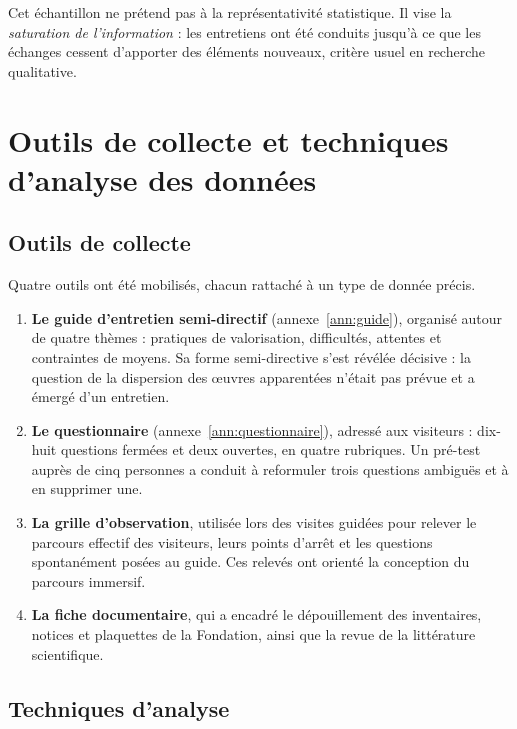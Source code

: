 Cet échantillon ne prétend pas à la représentativité statistique. Il vise la
\emph{saturation de l'information} : les entretiens ont été conduits jusqu'à ce
que les échanges cessent d'apporter des éléments nouveaux, critère usuel en
recherche qualitative.

\section{Outils de collecte et techniques d'analyse des données}
\label{sec:outils}

\subsection{Outils de collecte}

Quatre outils ont été mobilisés, chacun rattaché à un type de donnée précis.

\begin{enumerate}
  \item \textbf{Le guide d'entretien semi-directif} (annexe~\ref{ann:guide}),
        organisé autour de quatre thèmes : pratiques de valorisation,
        difficultés, attentes et contraintes de moyens. Sa forme semi-directive
        s'est révélée décisive : la question de la dispersion des œuvres
        apparentées n'était pas prévue et a émergé d'un entretien.

  \item \textbf{Le questionnaire} (annexe~\ref{ann:questionnaire}), adressé aux
        visiteurs : dix-huit questions fermées et deux ouvertes, en quatre
        rubriques. Un pré-test auprès de cinq personnes a conduit à reformuler
        trois questions ambiguës et à en supprimer une.

  \item \textbf{La grille d'observation}, utilisée lors des visites guidées pour
        relever le parcours effectif des visiteurs, leurs points d'arrêt et les
        questions spontanément posées au guide. Ces relevés ont orienté la
        conception du parcours immersif.

  \item \textbf{La fiche documentaire}, qui a encadré le dépouillement des
        inventaires, notices et plaquettes de la Fondation, ainsi que la revue
        de la littérature scientifique.
\end{enumerate}

\subsection{Techniques d'analyse}

